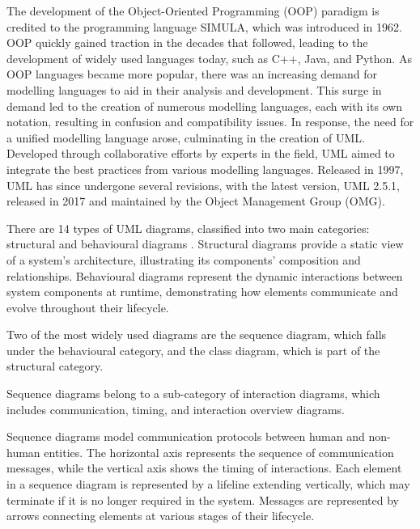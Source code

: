 \documentclass{article}
\newcounter{subsubsubsection}[subsubsection]
\begin{document}
{The development of the Object-Oriented Programming (OOP) paradigm is credited to the programming language SIMULA, which was introduced in 1962\cite{Simula}. OOP quickly gained traction in the decades that followed, leading to the development of widely used languages today, such as C++, Java, and Python\cite{Seidl_Scholz_Huemer_Kappel_Duffy_2014}. As OOP languages became more popular, there was an increasing demand for modelling languages to aid in their analysis and development. This surge in demand led to the creation of numerous modelling languages, each with its own notation, resulting in confusion and compatibility issues\cite{Seidl_Scholz_Huemer_Kappel_Duffy_2014}. In response, the need for a unified modelling language arose, culminating in the creation of UML. Developed through collaborative efforts by experts in the field, UML aimed to integrate the best practices from various modelling languages\cite{Seidl_Scholz_Huemer_Kappel_Duffy_2014}. Released in 1997, UML has since undergone several revisions, with the latest version, UML 2.5.1, released in 2017 and maintained by the Object Management Group (OMG)\cite{OMG_UML}.

There are 14 types of UML diagrams, classified into two main categories: structural and behavioural diagrams \cite{Seidl_Scholz_Huemer_Kappel_Duffy_2014}. Structural diagrams provide a static view of a system's architecture, illustrating its components' composition and relationships. Behavioural diagrams represent the dynamic interactions between system components at runtime, demonstrating how elements communicate and evolve throughout their lifecycle. 

Two of the most widely used diagrams are the sequence diagram, which falls under the behavioural category, and the class diagram, which is part of the structural category.


Sequence diagrams belong to a sub-category of interaction diagrams, which includes communication, timing, and interaction overview diagrams\cite{Seidl_Scholz_Huemer_Kappel_Duffy_2014}.

Sequence diagrams model communication protocols between human and non-human entities. The horizontal axis represents the sequence of communication messages, while the vertical axis shows the timing of interactions. Each element in a sequence diagram is represented by a lifeline extending vertically, which may terminate if it is no longer required in the system. Messages are represented by arrows connecting elements at various stages of their lifecycle.

}
\end{document}
